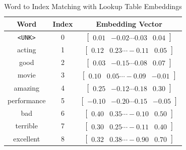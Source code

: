 \documentclass[12pt,a4paper]{article}
\begin{document}
\begin{table}[h!]
    \centering
    \begin{tabular}{|c|c|c|}
        \hline
        \textbf{Word} & \textbf{Index} & \textbf{Embedding Vector} \\ \hline
        \texttt{<UNK>} & 0 & $\begin{bmatrix} 0.01 & -0.02 \cdots 0.03 & 0.04 \end{bmatrix}$ \\ \hline
        acting & 1 & $\begin{bmatrix} 0.12 & 0.23 \cdots -0.11 & 0.05 \end{bmatrix}$ \\ \hline
        good & 2 & $\begin{bmatrix} 0.03 & -0.15 \cdots 0.08 & 0.07 \end{bmatrix}$ \\ \hline
        movie & 3 & $\begin{bmatrix} 0.10 & 0.05 \cdots -0.09 & -0.01 \end{bmatrix}$ \\ \hline
        amazing & 4 & $\begin{bmatrix} 0.25 & -0.12 \cdots 0.18 & 0.30 \end{bmatrix}$ \\ \hline
        performance & 5 & $\begin{bmatrix} -0.10 & -0.20 \cdots 0.15 & -0.05 \end{bmatrix}$ \\ \hline
        bad & 6 & $\begin{bmatrix} 0.40 & 0.35 \cdots -0.10 & 0.50 \end{bmatrix}$ \\ \hline
        terrible & 7 & $\begin{bmatrix} 0.30 & 0.25 \cdots -0.11 & 0.40 \end{bmatrix}$ \\ \hline
        excellent & 8 & $\begin{bmatrix} 0.32 & 0.38 \cdots -0.90 & 0.70 \end{bmatrix}$ \\ \hline
    \end{tabular}
    \caption{Word to Index Matching with Lookup Table Embeddings}
    \label{tab:word_lookup}
\end{table}
\end{document}
